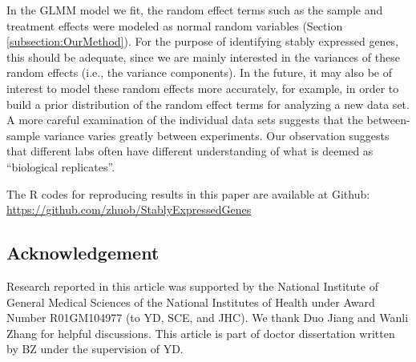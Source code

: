 			
			In the GLMM model we fit, the random effect terms such as the sample and treatment
			effects were modeled as normal random variables (Section
			\ref{subsection:OurMethod}). For the purpose of identifying stably
			expressed genes, this should be adequate, since we are mainly interested in
			the variances of these random effects (i.e., the variance components). In the
			future, it may also be of interest to model these random effects more
			accurately, for example, in order to build a prior distribution of the random
			effect terms for analyzing a new data set. A more careful examination of the
			individual data sets suggests that the between-sample variance varies greatly
			between experiments. Our observation suggests that different labs often have
			different understanding of what is deemed as ``biological replicates''.
			
			The R codes for reproducing results in this paper are available at Github:
			\url{https://github.com/zhuob/StablyExpressedGenes}
			
			\subsection*{Acknowledgement}	
			 Research reported in this article was supported by the National Institute of 
			 General Medical Sciences of the National Institutes of Health under Award Number 
			 R01GM104977 (to YD, SCE, and JHC). We thank Duo Jiang and Wanli Zhang for helpful 
			 discussions. This article is part of doctor dissertation written by BZ under the 
			 supervision of YD. 
			
			
			
			\newpage
